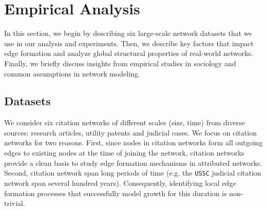 \section{Empirical Analysis}
\label{sec:Analysis}

In this section, we begin by describing six large-scale network datasets that we use in our
analysis and experiments. Then, we
describe key factors that impact edge formation and analyze global structural
properties of real-world networks. Finally, we briefly discuss insights from
empirical studies in sociology and common assumptions in network modeling.

\subsection{Datasets}
\label{sec:Datasets}

We consider six citation networks of different scales (size, time) from diverse sources: research articles, utility patents and judicial cases. We focus on citation networks for two reasons. First, since nodes in citation networks form all outgoing edges to existing nodes at the time of joining the network, citation networks provide a clean basis to study edge formation mechanisms in attributed networks. Second, citation network span long periods of time (e.g. the \texttt{USSC} judicial citation network span several hundred years). Consequently, identifying local edge formation processes that successfully model growth for this duration is non-trivial.





